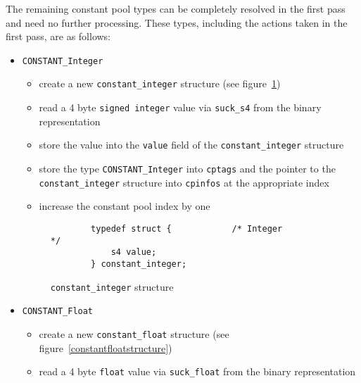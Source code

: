 The remaining constant pool types can be completely resolved in the
first pass and need no further processing. These types, including the
actions taken in the first pass, are as follows:

\begin{itemize}

 \item \texttt{CONSTANT\_Integer}

 \begin{itemize}

  \item create a new \texttt{constant\_integer} structure (see
  figure~\ref{constantintegerstructure})

  \item read a 4 byte \texttt{signed integer} value via
  \texttt{suck\_s4} from the binary representation

  \item store the value into the \texttt{value} field of the
  \texttt{constant\_integer} structure

  \item store the type \texttt{CONSTANT\_Integer} into \texttt{cptags}
  and the pointer to the \texttt{constant\_integer} structure into
  \texttt{cpinfos} at the appropriate index

  \item increase the constant pool index by one

 \end{itemize}

\begin{figure}[h]
\begin{verbatim}
        typedef struct {            /* Integer                                    */
            s4 value;
        } constant_integer;
\end{verbatim}
\caption{\texttt{constant\_integer} structure}
\label{constantintegerstructure}
\end{figure}

 \item \texttt{CONSTANT\_Float}

 \begin{itemize}

  \item create a new \texttt{constant\_float} structure (see
  figure~\ref{constantfloatstructure})

  \item read a 4 byte \texttt{float} value via \texttt{suck\_float}
  from the binary representation


\end{itemize}
\end{itemize}
